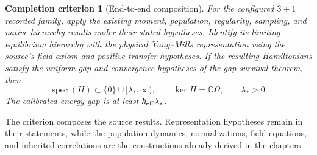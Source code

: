 \documentclass[11pt,a4paper]{article}
\newtheorem{criterion}{Completion criterion}
\newcommand{\Spec}{\operatorname{spec}}
\begin{document}
\begin{criterion}[End-to-end composition]
For the configured \(3+1\) recorded family, apply the existing moment, population, regularity, sampling, and native-hierarchy results under their stated hypotheses. Identify its limiting equilibrium hierarchy with the physical Yang--Mills representation using the source's field-axiom and positive-transfer hypotheses. If the resulting Hamiltonians satisfy the uniform gap and convergence hypotheses of the gap-survival theorem, then
\[
\Spec(H)\subset\{0\}\cup[\lambda_*,\infty),\qquad
\ker H=\mathbb C\Omega,\qquad\lambda_*>0.
\]
The calibrated energy gap is at least \(\hbar_{\rm eff}\lambda_*\).
\end{criterion}
The criterion composes the source results. Representation hypotheses remain in their statements, while the population dynamics, normalizations, field equations, and inherited correlations are the constructions already derived in the chapters.

\clearpage
\end{document}
